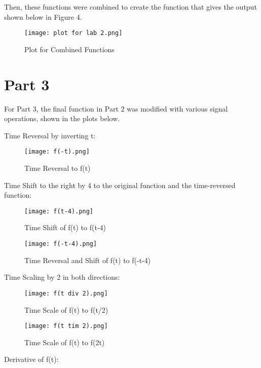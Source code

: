 \documentclass[12pt]{article}
\begin{document}
\newpage

Then, these functions were combined to create the function that gives the output shown below in Figure 4.

\begin{figure}[h!]
    \centering
    \texttt{[image: plot for lab 2.png]}
    \caption{Plot for Combined Functions}
\end{figure}

\section{Part 3}

For Part 3, the final function in Part 2 was modified with various signal operations, shown in the plots below.

Time Reversal by inverting t:

\begin{figure}[h!]
    \centering
    \texttt{[image: f(-t).png]}
    \caption{Time Reversal to f(t)}
\end{figure}

\newpage

Time Shift to the right by 4 to the original function and the time-reversed function:

\begin{figure}[h!]
    \centering
    \texttt{[image: f(t-4).png]}
    \caption{Time Shift of f(t) to f(t-4)}
\end{figure}

\begin{figure}[h!]
    \centering
    \texttt{[image: f(-t-4).png]}
    \caption{Time Reversal and Shift of f(t) to f(-t-4)}
\end{figure}

\newpage

Time Scaling by 2 in both directions:

\begin{figure}[h!]
    \centering
    \texttt{[image: f(t div 2).png]}
    \caption{Time Scale of f(t) to f(t/2)}
\end{figure}

\begin{figure}[h!]
    \centering
    \texttt{[image: f(t tim 2).png]}
    \caption{Time Scale of f(t) to f(2t)}
\end{figure}

\newpage

Derivative of f(t):
\end{document}

